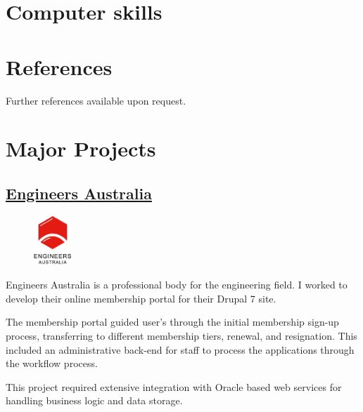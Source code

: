 \documentclass[11pt,a4paper,sans]{moderncv}        %
\begin{document}
\section{Computer skills}

\section{References}
  Further references available upon request.

\clearpage
\section{Major Projects}
  \subsection{\href{https://www.engineersaustralia.org.au/}{Engineers Australia}}
    \begin{figure}
      \vspace{-10pt}
      \includegraphics[width=0.125\textwidth]{EA_logo}
      \vspace{-20pt}
    \end{figure}
    Engineers Australia is a professional body for the engineering field. I worked to develop their online membership portal for their Drupal 7 site.

    The membership portal guided user's through the initial membership sign-up process, transferring to different membership tiers, renewal, and resignation. This included an administrative back-end for staff to process the applications through the workflow process.

    This project required extensive integration with Oracle based web services for handling business logic and data storage.
\end{document}
